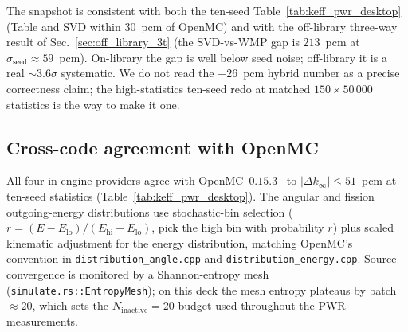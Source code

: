 The snapshot is consistent with both the ten-seed
Table~\ref{tab:keff_pwr_desktop} (Table and SVD within
$30$~pcm of OpenMC) and with the off-library three-way
result of Sec.~\ref{sec:off_library_3t} (the SVD-vs-WMP gap
is $213$~pcm at $\sigma_\text{seed} \approx 59$~pcm).
On-library the gap is well below seed noise; off-library it
is a real $\sim\!3.6\sigma$ systematic. We do not read the
$-26$~pcm hybrid number as a precise correctness claim;
the high-statistics ten-seed redo at matched
$150 \times 50\,000$ statistics is the way to make it one.

\subsection{Cross-code agreement with OpenMC}
\label{sec:offset}

All four in-engine providers agree with
OpenMC~$0.15.3$~\cite{romano2015openmc} to
$|\Delta k_\infty| \le 51$~pcm at ten-seed statistics
(Table~\ref{tab:keff_pwr_desktop}). The angular and
fission outgoing-energy distributions use stochastic-bin
selection ($r = (E - E_\text{lo})/(E_\text{hi}-E_\text{lo})$,
pick the high bin with probability $r$) plus scaled
kinematic adjustment for the energy distribution, matching
OpenMC's convention in \texttt{distribution\_angle.cpp}
and \texttt{distribution\_energy.cpp}. Source convergence
is monitored by a Shannon-entropy mesh
(\texttt{simulate.rs::EntropyMesh}); on this deck the
mesh entropy plateaus by batch $\approx 20$, which sets
the $N_\text{inactive}=20$ budget used throughout the
PWR measurements.

